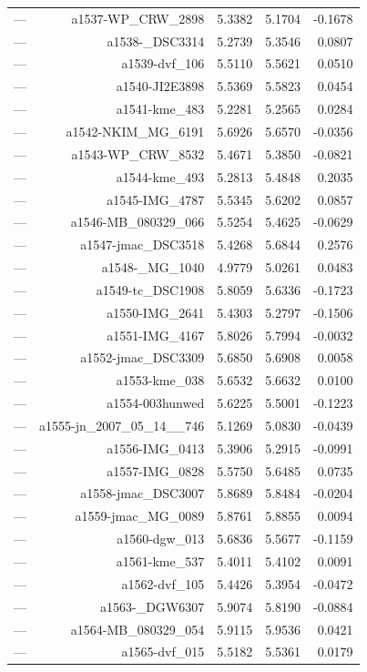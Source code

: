 \begin{table}[htbp]
\begin{tabular}{lrrrr}
— & a1537-WP_CRW_2898 & 5.3382 & 5.1704 & -0.1678 \\
— & a1538-_DSC3314 & 5.2739 & 5.3546 & 0.0807 \\
— & a1539-dvf_106 & 5.5110 & 5.5621 & 0.0510 \\
— & a1540-JI2E3898 & 5.5369 & 5.5823 & 0.0454 \\
— & a1541-kme_483 & 5.2281 & 5.2565 & 0.0284 \\
— & a1542-NKIM_MG_6191 & 5.6926 & 5.6570 & -0.0356 \\
— & a1543-WP_CRW_8532 & 5.4671 & 5.3850 & -0.0821 \\
— & a1544-kme_493 & 5.2813 & 5.4848 & 0.2035 \\
— & a1545-IMG_4787 & 5.5345 & 5.6202 & 0.0857 \\
— & a1546-MB_080329_066 & 5.5254 & 5.4625 & -0.0629 \\
— & a1547-jmac_DSC3518 & 5.4268 & 5.6844 & 0.2576 \\
— & a1548-_MG_1040 & 4.9779 & 5.0261 & 0.0483 \\
— & a1549-tc_DSC1908 & 5.8059 & 5.6336 & -0.1723 \\
— & a1550-IMG_2641 & 5.4303 & 5.2797 & -0.1506 \\
— & a1551-IMG_4167 & 5.8026 & 5.7994 & -0.0032 \\
— & a1552-jmac_DSC3309 & 5.6850 & 5.6908 & 0.0058 \\
— & a1553-kme_038 & 5.6532 & 5.6632 & 0.0100 \\
— & a1554-003hunwed & 5.6225 & 5.5001 & -0.1223 \\
— & a1555-jn_2007_05_14__746 & 5.1269 & 5.0830 & -0.0439 \\
— & a1556-IMG_0413 & 5.3906 & 5.2915 & -0.0991 \\
— & a1557-IMG_0828 & 5.5750 & 5.6485 & 0.0735 \\
— & a1558-jmac_DSC3007 & 5.8689 & 5.8484 & -0.0204 \\
— & a1559-jmac_MG_0089 & 5.8761 & 5.8855 & 0.0094 \\
— & a1560-dgw_013 & 5.6836 & 5.5677 & -0.1159 \\
— & a1561-kme_537 & 5.4011 & 5.4102 & 0.0091 \\
— & a1562-dvf_105 & 5.4426 & 5.3954 & -0.0472 \\
— & a1563-_DGW6307 & 5.9074 & 5.8190 & -0.0884 \\
— & a1564-MB_080329_054 & 5.9115 & 5.9536 & 0.0421 \\
— & a1565-dvf_015 & 5.5182 & 5.5361 & 0.0179 \\

\end{tabular}
\end{table}
